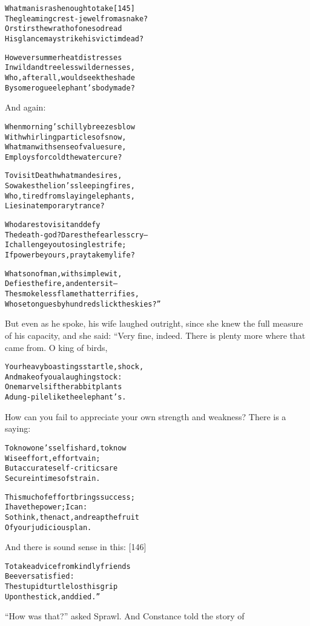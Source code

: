 \documentclass{article}
\renewenvironment{verbatim}{\begin{alltt}\normalfont\begin{centering}}{\end{centering}\end{alltt}}
\begin{document}
\begin{verbatim}
What man is rash enough to take                         [145]
The gleaming crest-jewel from a snake?
Or stirs the wrath of one so dread
His glance may strike his victim dead?

However summer heat distresses
In wild and treeless wildernesses,
Who, after all, would seek the shade
By some rogue elephant's body made?
\end{verbatim}
And again:

\begin{verbatim}
When morning's chilly breezes blow
With whirling particles of snow,
What man with sense of value sure,
Employs for cold the water cure?

To visit Death what man desires,
So wakes the lion's sleeping fires,
Who, tired from slaying elephants,
Lies in a temporary trance?

Who dares to visit and defy
The death-god? Dares the fearless cry--
I challenge you to single strife;
If power be yours, pray take my life?

What son of man, with simple wit,
Defies the fire, and enters it--
The smokeless flame that terrifies,
Whose tongues by hundreds lick the skies?”
\end{verbatim}
But even as he spoke, his wife laughed outright, since she knew the
full measure of his capacity, and she said: “Very fine, indeed.
There is plenty more where that came from. O king of birds,

\begin{verbatim}
Your heavy boastings startle, shock,
And make of you a laughingstock:
One marvels if the rabbit plants
A dung-pile like the elephant's.
\end{verbatim}
How can you fail to appreciate your own strength and weakness?
There is a saying:

\begin{verbatim}
To know one's self is hard, to know
Wise effort, effort vain;
But accurate self-critics are
Secure in times of strain.

This much of effort brings success;
I have the power; I can:
So think, then act, and reap the fruit
Of your judicious plan.
\end{verbatim}
And there is sound sense in this: [146]

\begin{verbatim}
To take advice from kindly friends
Be ever satisfied:
The stupid turtle lost his grip
Upon the stick, and died.”
\end{verbatim}
``How was that?'' asked Sprawl. And Constance told the story of
\end{document}
